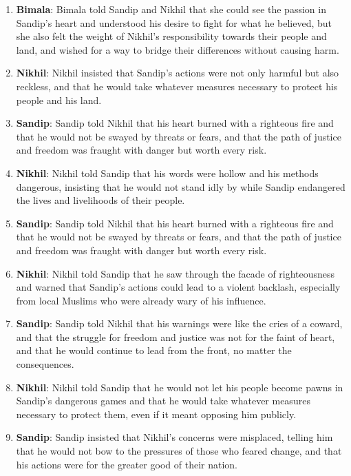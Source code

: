 \documentclass[10pt]{article}
\begin{document}
\begin{enumerate}
\item \textbf{Bimala}: Bimala told Sandip and Nikhil that she could see the passion in Sandip's heart and understood his desire to fight for what he believed, but she also felt the weight of Nikhil's responsibility towards their people and land, and wished for a way to bridge their differences without causing harm.

\item \textbf{Nikhil}: Nikhil insisted that Sandip's actions were not only harmful but also reckless, and that he would take whatever measures necessary to protect his people and his land.

\item \textbf{Sandip}: Sandip told Nikhil that his heart burned with a righteous fire and that he would not be swayed by threats or fears, and that the path of justice and freedom was fraught with danger but worth every risk.

\item \textbf{Nikhil}: Nikhil told Sandip that his words were hollow and his methods dangerous, insisting that he would not stand idly by while Sandip endangered the lives and livelihoods of their people.

\item \textbf{Sandip}: Sandip told Nikhil that his heart burned with a righteous fire and that he would not be swayed by threats or fears, and that the path of justice and freedom was fraught with danger but worth every risk.

\item \textbf{Nikhil}: Nikhil told Sandip that he saw through the facade of righteousness and warned that Sandip's actions could lead to a violent backlash, especially from local Muslims who were already wary of his influence.

\item \textbf{Sandip}: Sandip told Nikhil that his warnings were like the cries of a coward, and that the struggle for freedom and justice was not for the faint of heart, and that he would continue to lead from the front, no matter the consequences.

\item \textbf{Nikhil}: Nikhil told Sandip that he would not let his people become pawns in Sandip's dangerous games and that he would take whatever measures necessary to protect them, even if it meant opposing him publicly.

\item \textbf{Sandip}: Sandip insisted that Nikhil's concerns were misplaced, telling him that he would not bow to the pressures of those who feared change, and that his actions were for the greater good of their nation.


\end{enumerate}
\end{document}
